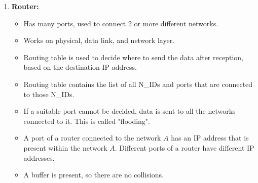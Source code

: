 \documentclass{article}
\begin{document}
\begin{enumerate}
\begin{itemize}
	\end{itemize}
	\item \textbf{Router:}\begin{itemize}
		\item Has many ports, used to connect 2 or more different networks.
		\item Works on physical, data link, and network layer.
		\item Routing table is used to decide where to send the data after reception, based on the destination IP address.
		\item Routing table contains the list of all N\_IDs and ports that are connected to those N\_IDs.
		\item If a suitable port cannot be decided, data is sent to all the networks connected to it. This is called "flooding".
		\item A port of a router connected to the network $A$ has an IP address that is present within the network $A$. Different ports of a router have different IP addresses.
		\item A buffer is present, so there are no collisions.
	\end{itemize}
\end{enumerate}
\end{document}
